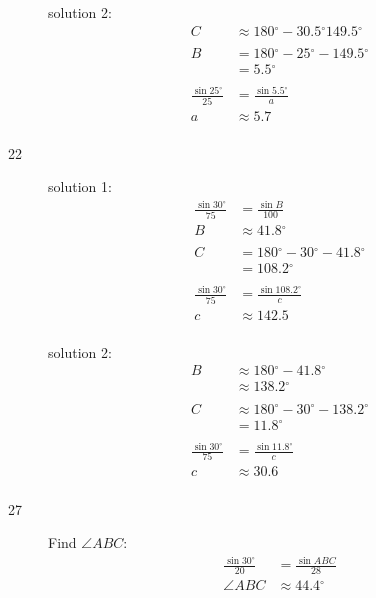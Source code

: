 \documentclass{exam}
\newcommand{\dg}{\ensuremath{^\circ}}
\begin{document}
\begin{description}
        solution 2:
        \begin{align*}
          C & \approx 180 \dg - 30.5 \dg \boxed{ 149.5 \dg } \\
          \\
          B & = 180 \dg - 25 \dg - 149.5 \dg \\
            & = \boxed{ 5.5 \dg } \\
          \\
          \frac{\sin 25 \dg}{25} & = \frac{\sin 5.5 \dg}{a} \\
          a                      & \approx \boxed{ 5.7 } \\
        \end{align*}

      \item[22] 
        solution 1:
        \begin{align*}
          \frac{\sin 30 \dg}{75} & = \frac{\sin B}{100} \\
          B                      & \approx \boxed{ 41.8 \dg } \\
          \\
          C & = 180 \dg - 30 \dg - 41.8 \dg \\
            & = \boxed{ 108.2 \dg } \\
          \\
          \frac{\sin 30 \dg}{75} & = \frac{\sin 108.2 \dg}{c} \\
          c                      & \approx \boxed{ 142.5 } \\
        \end{align*}

        solution 2:
        \begin{align*}
          B & \approx 180 \dg - 41.8 \dg \\
            & \approx \boxed{ 138.2 \dg } \\
          \\
          C & \approx 180 \dg - 30 \dg - 138.2 \dg \\
            & = \boxed{ 11.8 \dg } \\
          \\
          \frac{\sin 30 \dg}{75} & = \frac{\sin 11.8 \dg}{c} \\
          c                      & \approx \boxed{ 30.6 } \\
        \end{align*}

      \pagebreak

      \item[27] 
        Find $\angle ABC$:
        \begin{align*}
          \frac{\sin 30 \dg}{20} & = \frac{\sin ABC}{28} \\
          \angle ABC             & \approx 44.4 \dg \\
        \end{align*}


\end{description}
\end{document}

